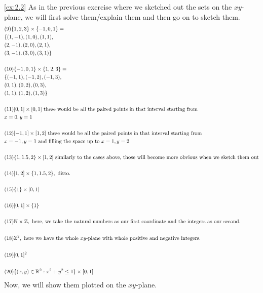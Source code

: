 \begin{solution}\label{sol:2.2}\ref{ex:2.2}
    As in the previous exercise where we sketched out the sets on the $xy$-plane, we will first solve them/explain them and then go on to sketch them.
    $$
    \begin{aligned}
        &(9) \{ 1,2,3 \}\times \{ -1,0,1 \}=\\
        &\{ (1,-1),(1,0),(1,1),\\
        &(2,-1),(2,0),(2,1),\\
        &(3,-1),(3,0),(3,1) \}\\\\
        &(10) \{ -1,0,1 \}\times \{ 1,2,3 \}=\\
        &\{ (-1,1),(-1,2),(-1,3),\\
        & (0,1),(0,2),(0,3),\\
        & (1,1),(1,2),(1,3) \}\\\\
        &(11) [0,1]\times [0,1] \text{ these would be all the paired points in that interval starting from }\\
        &x=0,y=1\\\\
        &(12) [-1,1]\times [1,2] \text{ these would be all the paired points in that interval starting from }\\
        &x=-1,y=1 \text{ and filling the space up to } x=1,y=2\\\\
        &(13) \{ 1,1.5,2 \}\times [1,2] \text{ similarly to the cases above, those will become more obvious when we sketch them out}\\\\
        &(14) [1,2]\times \{ 1,1.5,2 \}, \text{ ditto.}\\\\
        &(15) \{ 1 \}\times [0,1]\\\\
        &(16) [0,1]\times \{ 1 \}\\\\
        &(17) \mathbb{N}\times\mathbb{Z},\text{ here, we take the natural numbers as our first coordinate and the integers as our second.}\\\\
        &(18) \mathbb{Z}^2,\text{ here we have the whole } xy \text{-plane with whole positive and negative integers.}\\\\
        &(19) [0,1]{^2}\\\\
        &(20) \{ (x,y)\in\mathbb{R}^2:x^2+y^2\le 1 \}\times [0,1].
    \end{aligned}
    $$
    Now, we will show them plotted on the $xy$-plane. 


\end{solution}
